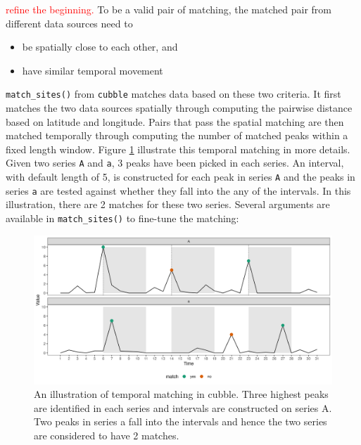 \documentclass[
]{jss}
\providecommand{\tightlist}{%
  \setlength{\itemsep}{0pt}\setlength{\parskip}{0pt}}
\begin{document}
\textcolor{red}{refine the beginning.} To be a valid pair of matching,
the matched pair from different data sources need to

\begin{itemize}
\tightlist
\item
  be spatially close to each other, and
\item
  have similar temporal movement
\end{itemize}

\texttt{match\_sites()} from \texttt{cubble} matches data based on these
two criteria. It first matches the two data sources spatially through
computing the pairwise distance based on latitude and longitude. Pairs
that pass the spatial matching are then matched temporally through
computing the number of matched peaks within a fixed length window.
Figure \ref{fig:illu-matching} illustrate this temporal matching in more
details. Given two series \texttt{A} and \texttt{a}, 3 peaks have been
picked in each series. An interval, with default length of 5, is
constructed for each peak in series \texttt{A} and the peaks in series
\texttt{a} are tested against whether they fall into the any of the
intervals. In this illustration, there are 2 matches for these two
series. Several arguments are available in \texttt{match\_sites()} to
fine-tune the matching:

\begin{CodeChunk}
\begin{figure}

{\centering \includegraphics[width=1\linewidth]{figures/illu-matching} 

}

\caption[An illustration of temporal matching in cubble]{An illustration of temporal matching in cubble. Three highest peaks are identified in each series and intervals are constructed on series A. Two peaks in series a fall into the intervals and hence the two series are considered to have 2 matches.}\label{fig:illu-matching}
\end{figure}
\end{CodeChunk}
\end{document}
